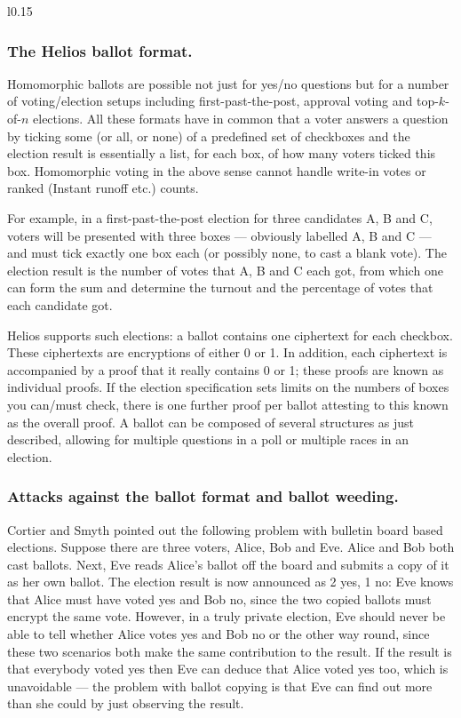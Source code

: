 \documentclass[envcountsame]{llncs}
\newenvironment{helios}{\begin{framed}
\vspace{-18pt}
\begin{wrapfigure}{l}{0.15\textwidth}
\vspace{-12pt}\quad{\Huge \Sun}
\end{wrapfigure}}{\end{framed}}
\begin{document}
\begin{helios}
\subsubsection{The Helios ballot format.}
Homomorphic ballots are possible not just for yes/no questions but for a number
of voting/election setups including first-past-the-post, approval voting and
top-$k$-of-$n$ elections. All these formats have in common that a voter answers
a question by ticking some (or all, or none) of a predefined set of checkboxes
and the election result is essentially a list, for each box, of how many voters
ticked this box.
Homomorphic voting in the above sense cannot handle write-in votes or ranked
(Instant runoff etc.) counts.

For example, in a first-past-the-post election for three candidates A, B and C,
voters will be presented with three boxes --- obviously labelled A, B and C ---
and must tick exactly one box each (or possibly none, to cast a blank vote). The
election result is the number of votes that A, B and C each got, from which one
can form the sum and determine the turnout and the percentage of votes that each
candidate got.

Helios supports such elections: a ballot contains one ciphertext for each
checkbox. These ciphertexts are encryptions of either 0 or 1. In addition, each
ciphertext is accompanied by a proof that it really contains 0 or 1; these
proofs are known as individual proofs. If the election specification sets limits
on the numbers of boxes you can/must check, there is one further proof per
ballot attesting to this known as the overall proof. A ballot can be composed of
several structures as just described, allowing for multiple questions in a poll
or multiple races in an election.

\subsubsection{Attacks against the ballot format and ballot weeding.}
Cortier and Smyth \cite{CS13} pointed out the following problem with bulletin
board based elections. Suppose there are three voters, Alice, Bob and Eve. Alice
and Bob both cast ballots. Next, Eve reads Alice's ballot off the board and
submits a copy of it as her own ballot. The election result is now announced as
2 yes, 1 no: Eve knows that Alice must have voted yes and Bob no, since the two
copied ballots must encrypt the same vote. However, in a truly private election,
Eve should never be able to tell whether Alice votes yes and Bob no or the other
way round, since these two scenarios both make the same contribution to the
result. If the result is that everybody voted yes then Eve can deduce that Alice
voted yes too, which is unavoidable --- the problem with ballot copying is that
Eve can find out more than she could by just observing the result.


\end{helios}
\end{document}

